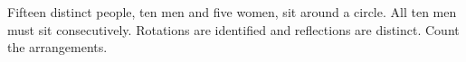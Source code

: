 Fifteen distinct people, ten men and five women, sit around a circle. All ten men must sit consecutively. Rotations are identified and reflections are distinct. Count the arrangements.

